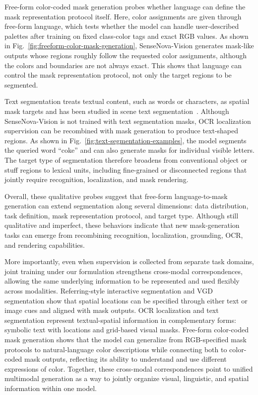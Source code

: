 Free-form color-coded mask generation probes whether language can define the mask representation protocol itself.
Here, color assignments are given through free-form language, which tests whether the model can handle user-described palettes after training on fixed class-color tags and exact RGB values.
As shown in Fig.~\ref{fig:freeform-color-mask-generation}, SenseNova-Vision generates mask-like outputs whose regions roughly follow the requested color assignments, although the colors and boundaries are not always exact.
This shows that language can control the mask representation protocol, not only the target regions to be segmented.

Text segmentation treats textual content, such as words or characters, as spatial mask targets and has been studied in scene text segmentation~\cite{xu2021rethinking,yu2024eaformer}.
Although SenseNova-Vision is not trained with text segmentation masks, OCR localization supervision can be recombined with mask generation to produce text-shaped regions.
As shown in Fig.~\ref{fig:text-segmentation-examples}, the model segments the queried word ``coke'' and can also generate masks for individual visible letters.
The target type of segmentation therefore broadens from conventional object or stuff regions to lexical units, including fine-grained or disconnected regions that jointly require recognition, localization, and mask rendering.

Overall, these qualitative probes suggest that free-form language-to-mask generation can extend segmentation along several dimensions: data distribution, task definition, mask representation protocol, and target type.
Although still qualitative and imperfect, these behaviors indicate that new mask-generation tasks can emerge from recombining recognition, localization, grounding, OCR, and rendering capabilities.

More importantly, even when supervision is collected from separate task domains, joint training under our formulation strengthens cross-modal correspondences, allowing the same underlying information to be represented and used flexibly across modalities.
Referring-style interactive segmentation and VGD segmentation show that spatial locations can be specified through either text or image cues and aligned with mask outputs.
OCR localization and text segmentation represent textual-spatial information in complementary forms: symbolic text with locations and grid-based visual masks.
Free-form color-coded mask generation shows that the model can generalize from RGB-specified mask protocols to natural-language color descriptions while connecting both to color-coded mask outputs, reflecting its ability to understand and use different expressions of color.
Together, these cross-modal correspondences point to unified multimodal generation as a way to jointly organize visual, linguistic, and spatial information within one model.


